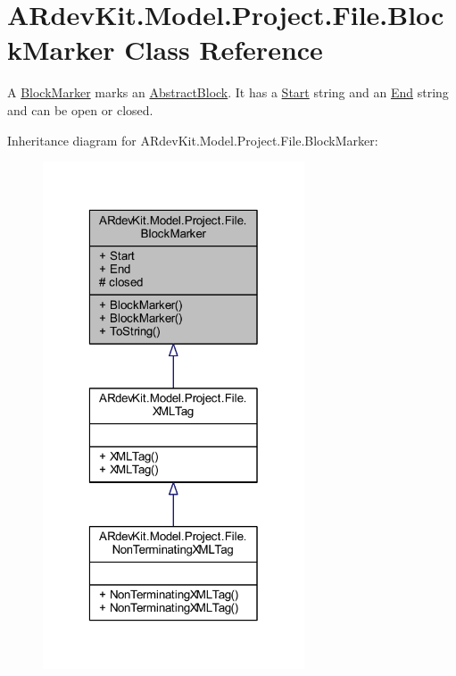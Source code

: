\hypertarget{class_a_rdev_kit_1_1_model_1_1_project_1_1_file_1_1_block_marker}{\section{A\-Rdev\-Kit.\-Model.\-Project.\-File.\-Block\-Marker Class Reference}
\label{class_a_rdev_kit_1_1_model_1_1_project_1_1_file_1_1_block_marker}
}


A \hyperlink{class_a_rdev_kit_1_1_model_1_1_project_1_1_file_1_1_block_marker}{Block\-Marker} marks an \hyperlink{class_a_rdev_kit_1_1_model_1_1_project_1_1_file_1_1_abstract_block}{Abstract\-Block}. It has a \hyperlink{class_a_rdev_kit_1_1_model_1_1_project_1_1_file_1_1_block_marker_a7764ae600714a07a74b8ddf55f1a59d5}{Start} string and an \hyperlink{class_a_rdev_kit_1_1_model_1_1_project_1_1_file_1_1_block_marker_a3672477b3c409c07c7189a57fbd004c4}{End} string and can be open or closed.  




Inheritance diagram for A\-Rdev\-Kit.\-Model.\-Project.\-File.\-Block\-Marker\-:
\nopagebreak
\begin{figure}[H]
\begin{center}
\leavevmode
\includegraphics[width=220pt]{class_a_rdev_kit_1_1_model_1_1_project_1_1_file_1_1_block_marker__inherit__graph}
\end{center}
\end{figure}


